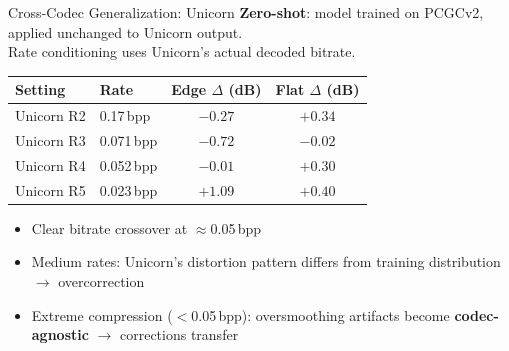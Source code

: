 \documentclass[aspectratio=169]{beamer}
\begin{document}
\begin{frame}{Cross-Codec Generalization: Unicorn}
  \textbf{Zero-shot}: model trained on PCGCv2, applied unchanged to Unicorn output.\\
  Rate conditioning uses Unicorn's actual decoded bitrate.

  \vspace{8pt}
  \begin{center}
    \begin{tabular}{llcc}
      \toprule
      Setting & Rate & Edge $\Delta$ (dB) & Flat $\Delta$ (dB) \\
      \midrule
      Unicorn R2 & 0.17\,bpp & $-0.27$ & $+0.34$ \\
      Unicorn R3 & 0.071\,bpp & $-0.72$ & $-0.02$ \\
      Unicorn R4 & 0.052\,bpp & $-0.01$ & $+0.30$ \\
      Unicorn R5 & 0.023\,bpp & $\mathbf{+1.09}$ & $\mathbf{+0.40}$ \\
      \bottomrule
    \end{tabular}
  \end{center}
  \vspace{8pt}
  \begin{itemize}
    \item Clear bitrate crossover at $\approx$0.05\,bpp
    \item Medium rates: Unicorn's distortion pattern differs from training distribution $\to$ overcorrection
    \item Extreme compression ($<$0.05\,bpp): oversmoothing artifacts become \textbf{codec-agnostic}
          $\to$ corrections transfer
  \end{itemize}
\end{frame}
\end{document}
